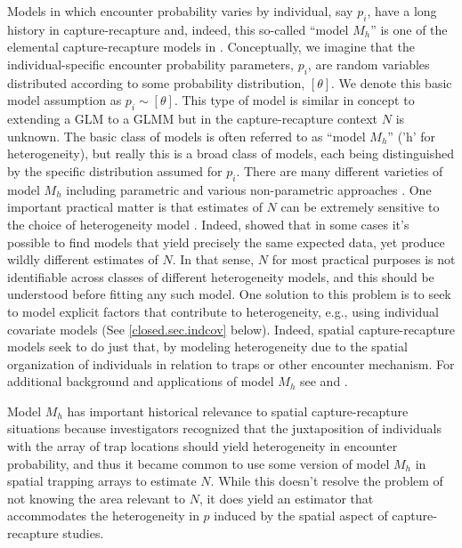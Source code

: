 Models in which encounter probability varies by individual, say
$p_{i}$, have a long history in capture-recapture and, indeed, this
so-called ``model $M_h$'' is one of the elemental capture-recapture
models in \citep{otis_etal:1978}. Conceptually, we imagine that 
the individual-specific encounter probability
parameters, $p_{i}$, are random variables distributed according to
some probability 
distribution, $[\theta]$. We denote this basic model assumption as
$p_{i} \sim [\theta]$. This type of model is similar in concept to
extending a GLM to a GLMM but in the capture-recapture context $N$ is
unknown.  The basic class of models is often referred to as ``model
$M_h$'' ('h' for heterogeneity), but really this is a broad class of models, each being
distinguished by the specific distribution assumed for $p_{i}$.  There
are many different varieties of model $M_{h}$ including parametric and
various 
non-parametric approaches
\citep{burnham_overton:1978, norris_pollock:1996, pledger:2000}. One
important practical matter is that estimates of $N$ can be extremely
sensitive to the choice of heterogeneity model
\citep{fienberg_etal:1999, dorazio_royle:2003, link:2003}. Indeed,
\citet{link:2003} showed that in some cases it's possible to find
models that yield precisely the same expected data, yet produce wildly
different estimates of $N$. In that sense, $N$ for most practical
purposes is not identifiable across classes of different heterogeneity
models, and
this should be understood before fitting any such model. One solution
to this problem is to seek to model explicit factors that contribute
to heterogeneity, e.g., using individual covariate models (See
\ref{closed.sec.indcov} below). Indeed, spatial capture-recapture
models seek to do just that, by modeling heterogeneity due to the
spatial organization of individuals in relation to traps or other
encounter mechanism.  For additional background and applications of
model $M_{h}$ see \citet[][Chapt. 6]{royle_dorazio:2008} and
\citet[][Chapt. 6]{kery_schaub:2011}.

Model $M_{h}$ has important historical relevance to spatial
capture-recapture situations \citep{karanth:1995} because
investigators recognized that the juxtaposition of individuals with
the array of trap locations should yield heterogeneity in encounter
probability, and thus it became common to use some version of model $M_h$
in spatial trapping arrays to estimate $N$.  While this doesn't
resolve the problem of not knowing the area relevant to $N$, it does
yield an estimator that accommodates the heterogeneity in $p$ induced
by the spatial aspect of capture-recapture studies.

